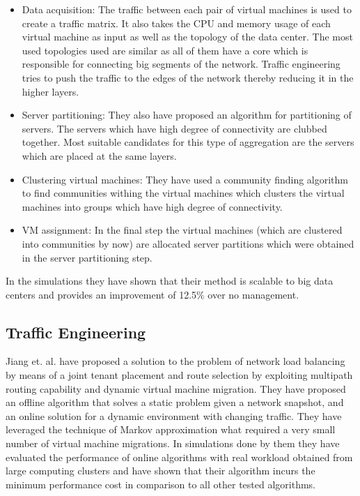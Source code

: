 \begin{itemize}
    \item Data acquisition: The traffic between each pair of virtual machines is used to create a traffic matrix. It also takes the CPU and memory usage of each virtual machine as input as well as the topology of the data center. The most used topologies used are similar as all of them have a core which is responsible for connecting big segments of the network. Traffic engineering tries to push the traffic to the edges of the network thereby reducing it in the higher layers. 
    \item Server partitioning: They also have proposed an algorithm for partitioning of servers. The servers which have high degree of connectivity are clubbed together. Most suitable candidates for this type of aggregation are the servers which are placed at the same layers.
    \item Clustering virtual machines: They \cite{dias2012online} have used a community finding algorithm to find communities withing the virtual machines which clusters the virtual machines into groups which have high degree of connectivity.
    \item VM assignment: In the final step the virtual machines (which are clustered into communities by now) are allocated server partitions which were obtained in the server partitioning step.
\end{itemize}
In the simulations they have shown that their method is scalable to big data centers and provides an improvement of 12.5\% over no management.

\subsection{Traffic Engineering}
Jiang et. al. \cite{jiang2012joint} have proposed a solution to the problem of network load balancing by means of a joint tenant placement and route selection by exploiting multipath routing capability and dynamic virtual machine migration. They have proposed an offline algorithm that solves a static problem given a network snapshot, and an online solution for a dynamic environment with changing traffic. They have leveraged the technique of Markov approximation what required a very small number of virtual machine migrations. In simulations done by them they have evaluated the performance of online algorithms with real workload obtained from large computing clusters and have shown that their algorithm incurs the minimum performance cost in comparison to all other tested algorithms.

